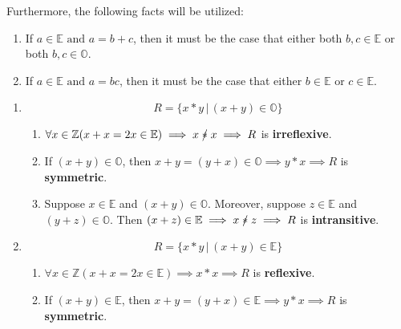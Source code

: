 \documentclass[12pt]{article}
\newcommand{\p}[1]{\item[\textnormal{(#1)}]}
\newcommand{\nir}{\mathrel{\mathrlap{/}*}}
\newenvironment{ps}
{\begin{enumerate}[leftmargin=0em, itemindent=1.5em]}
{\end{enumerate}}
\begin{document}
Furthermore, the following facts will be utilized:
\begin{enumerate}

    \item If \(a \in \mathbb{E} \text{ and } a = b + c \), then it must be the case that either both
        \( b,c \in \mathbb{E} \) or both \( b,c \in \mathbb{O} \).

    \item If \(a \in \mathbb{E} \text{ and } a = bc \), then it must be the case that either
        \( b \in \mathbb{E} \text{ or } c \in \mathbb{E} \).

\end{enumerate}


\begin{ps}

    \p{i}
        \[
            R = \{ x*y \,|\, (x+y) \in \mathbb{O} \}
        \]   

        \begin{enumerate}[label=\arabic*.]

            \item \(\forall x \in \mathbb{Z} (x + x = 2x \in \mathbb{E}) \implies x \nir x \implies
                R \) is \textbf{irreflexive}.

            \item If \( (x+y) \in \mathbb{O} \), then \( x+y = (y+x) \in \mathbb{O} \implies y*x
                \implies R \) is \textbf{symmetric}.

            \item Suppose \( x \in \mathbb{E} \) and \( (x+y) \in \mathbb{O} \). Moreover, suppose
                \( z \in \mathbb{E} \) and \( (y+z) \in \mathbb{O} \). Then \( (x+z) \in \mathbb{E}
                \implies x \nir z \implies R \)  is \textbf{intransitive}.

        \end{enumerate}

    \p{ii}
        \[
            R = \{ x*y \,|\, (x+y) \in \mathbb{E} \}
        \]   

        \begin{enumerate}[label=\arabic*.]

            \item \(\forall x \in \mathbb{Z} (x + x = 2x \in \mathbb{E}) \implies x * x
                \implies R \) is \textbf{reflexive}.

            \item If \( (x+y) \in \mathbb{E} \), then \( x+y = (y+x) \in \mathbb{E} \implies
                y*x \implies R \) is \textbf{symmetric}.
            

\end{enumerate}
\end{ps}
\end{document}
